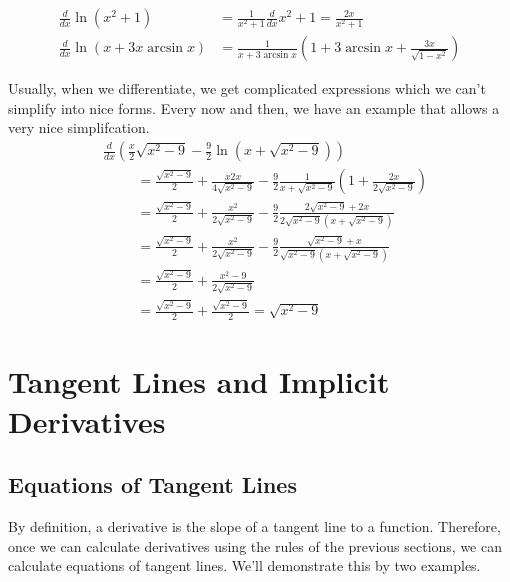 \documentclass[fleqn]{report}
\begin{document}
\begin{example}
\begin{align*}
\frac{d}{dx} \ln(x^2+1) & = \frac{1}{x^2+1} \frac{d}{dx} x^2+1 =
\frac{2x}{x^2+1} \\
\frac{d}{dx} \ln (x + 3x \arcsin x) & = \frac{1}{x+3\arcsin x}
\left( 1 + 3\arcsin x + \frac{3x}{\sqrt{1-x^2}} \right) 
\end{align*}
\end{example}

\begin{example}
Usually, when we differentiate, we get complicated expressions
which we can't simplify into nice forms. Every now and then,
we have an example that allows a very nice simplifcation.
\begin{align*}
& \frac{d}{dx} \left( \frac{x}{2} \sqrt{x^2-9} - \frac{9}{2} \ln(
x + \sqrt{x^2-9} ) \right) \\
& \hspace{1cm} = \frac{\sqrt{x^2-9}}{2} + \frac{x
2x}{4\sqrt{x^2-9}} - \frac{9}{2} \frac{1}{x+ \sqrt{x^2-9}}
\left( 1 + \frac{2x}{2\sqrt{x^2-9}} \right) \\
& \hspace{1cm} = \frac{\sqrt{x^2-9}}{2} +
\frac{x^2}{2\sqrt{x^2-9}} - \frac{9}{2} 
\frac{2 \sqrt{x^2-9} + 2x}{2\sqrt{x^2-9}(x+ \sqrt{x^2-9})} \\
& \hspace{1cm} = \frac{\sqrt{x^2-9}}{2} +
\frac{x^2}{2\sqrt{x^2-9}} - \frac{9}{2} 
\frac{\sqrt{x^2-9} + x}{\sqrt{x^2-9}(x+ \sqrt{x^2-9})} \\
& \hspace{1cm} = \frac{\sqrt{x^2-9}}{2} +
\frac{x^2-9}{2\sqrt{x^2-9}} \\
& \hspace{1cm} = \frac{\sqrt{x^2-9}}{2} +
\frac{\sqrt{x^2-9}}{2} = \sqrt{x^2-9}
\end{align*}
\end{example}

\section{Tangent Lines and Implicit Derivatives}
\label{tangent-lines-implicit}

\subsection{Equations of Tangent Lines}
\label{equations-tangent-lines}

By definition, a derivative is the slope of a tangent line to
a function. Therefore, once we can calculate derivatives using
the rules of the previous sections, we can calculate equations
of tangent lines. We'll demonstrate this by two examples.
\end{document}

